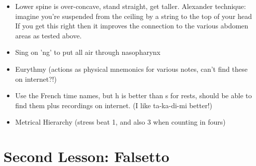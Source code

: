 \documentclass[14pt,a4paper]{memoir}
\begin{document}
\begin{itemize}
\item Lower spine is over-concave, stand straight, get taller.
Alexander technique: imagine you're suspended from the ceiling by a string to the top of your head
If you get this right then it improves the connection to the various abdomen areas as tested above.

\item Sing on 'ng' to put all air through nasopharynx

\item Eurythmy (actions as physical mnemonics for various notes, can't find these on internet?!)

\item Use the French time names, but h is better than s for rests, should be able to find them plus recordings on internet. (I like ta-ka-di-mi better!)

\item Metrical Hierarchy (stress beat 1, and also 3 when counting in fours)

\end{itemize}

\section*{Second Lesson: Falsetto}
\end{document}

